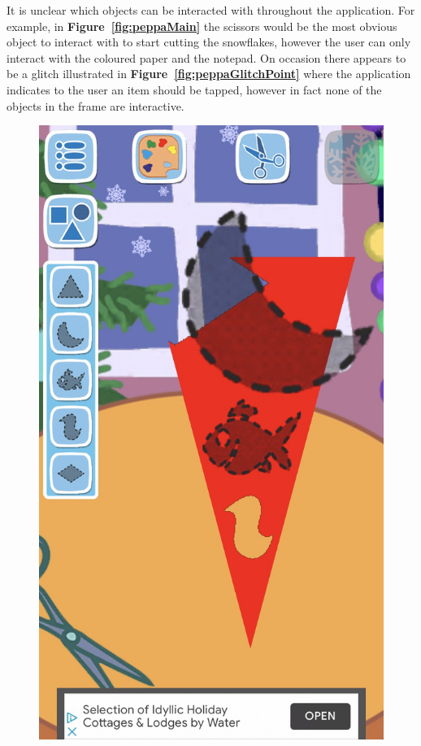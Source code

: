 \documentclass[11pt]{article}
\begin{document}
                    It is unclear which objects can be interacted with throughout the application. For example, in \textbf{Figure~\ref{fig:peppaMain}} the scissors would be the most obvious object to interact with to start cutting the snowflakes, however the user can only interact with the coloured paper and the notepad. On occasion there appears to be a glitch illustrated in \textbf{Figure~\ref{fig:peppaGlitchPoint}} where the application indicates to the user an item should be tapped, however in fact none of the objects in the frame are interactive. 
                    
                    \begin{figure}[!ht]
                        \begin{minipage}{0.32\textwidth}
                            \centering \includegraphics[width=0.8\linewidth]{Images/peppa/peppaShapes}

\end{minipage}
\end{figure}
\end{document}
